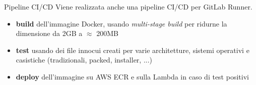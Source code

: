 \begin{frame}{Pipeline CI/CD}
Viene realizzata anche una pipeline CI/CD per GitLab Runner.
\vfill
{}
\begin{itemize}
    \item \textbf{build} dell'immagine Docker, usando \emph{multi-stage build} per ridurne la dimensione da 2GB a $\approx$ 200MB
    \item \textbf{test} usando dei file innocui creati per varie architetture, sistemi operativi e casistiche (tradizionali, packed, installer, ...)
    \item \textbf{deploy} dell'immagine su AWS ECR e sulla Lambda in caso di test positivi
\end{itemize}
\end{frame}